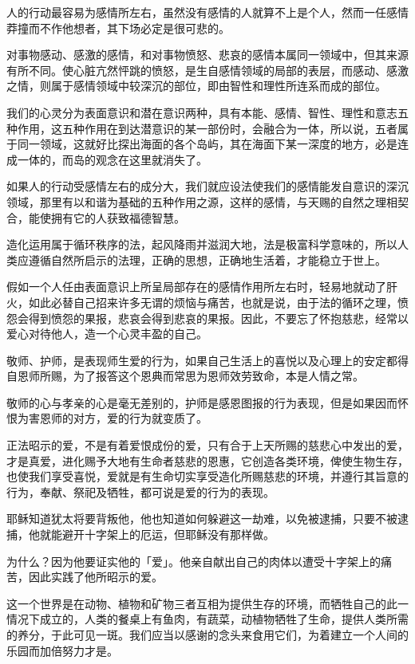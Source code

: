 \documentclass[12pt,twoside,openany]{book}
\begin{document}
人的行动最容易为感情所左右，虽然没有感情的人就算不上是个人，然而一任感情莽撞而不作他想者，其下场必定是很可悲的。

对事物感动、感激的感情，和对事物愤怒、悲哀的感情本属同一领域中，但其来源有所不同。使心脏亢然怦跳的愤怒，是生自感情领域的局部的表层，而感动、感激之情，则属于感情领域中较深沉的部位，即由智性和理性所连系而成的部位。

我们的心灵分为表面意识和潜在意识两种，具有本能、感情、智性、理性和意志五种作用，这五种作用在到达潜意识的某一部份时，会融合为一体，所以说，五者属于同一领域，这就好比探出海面的各个岛屿，其在海面下某一深度的地方，必是连成一体的，而岛的观念在这里就消失了。

如果人的行动受感情左右的成分大，我们就应设法使我们的感情能发自意识的深沉领域，那里有以和谐为基础的五种作用之源，这样的感情，与天赐的自然之理相契合，能使拥有它的人获致福德智慧。

造化运用属于循环秩序的法，起风降雨并滋润大地，法是极富科学意味的，所以人类应遵循自然所启示的法理，正确的思想，正确地生活着，才能稳立于世上。

假如一个人任由表面意识上所呈局部存在的感情作用所左右时，轻易地就动了肝火，如此必替自己招来许多无谓的烦恼与痛苦，也就是说，由于法的循环之理，愤怨会得到愤怨的果报，悲哀会得到悲哀的果报。因此，不要忘了怀抱慈悲，经常以爱心对待他人，造一个心灵丰盈的自己。

敬师、护师，是表现师生爱的行为，如果自己生活上的喜悦以及心理上的安定都得自恩师所赐，为了报答这个恩典而常思为恩师效劳致命，本是人情之常。

敬师的心与孝亲的心是毫无差别的，护师是感恩图报的行为表现，但是如果因而怀恨为害恩师的对方，爱的行为就变质了。

正法昭示的爱，不是有着爱恨成份的爱，只有合于上天所赐的慈悲心中发出的爱，才是真爱，进化赐予大地有生命者慈悲的恩惠，它创造各类环境，俾使生物生存，也使我们享受喜悦，爱就是有生命切实享受造化所赐慈悲的环境，并遵行其旨意的行为，奉献、祭祀及牺牲，都可说是爱的行为的表现。

耶稣知道犹太将要背叛他，他也知道如何躲避这一劫难，以免被逮捕，只要不被逮捕，他就能避开十字架上的厄运，但耶稣没有那样做。

为什么？因为他要证实他的「爱」。他亲自献出自己的肉体以遭受十字架上的痛苦，因此实践了他所昭示的爱。

这一个世界是在动物、植物和矿物三者互相为提供生存的环境，而牺牲自己的此一情况下成立的，人类的餐桌上有鱼肉，有蔬菜，动植物牺牲了生命，提供人类所需的养分，于此可见一斑。我们应当以感谢的念头来食用它们，为着建立一个人间的乐园而加倍努力才是。
\end{document}
